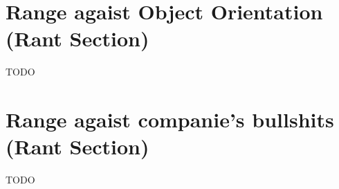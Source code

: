 \documentclass[11pt,a4paper,sans]{moderncv}
\begin{document}

\section{Range agaist Object Orientation (Rant Section)}
TODO

\section{Range agaist companie's bullshits (Rant Section)}
TODO
\end{document}
